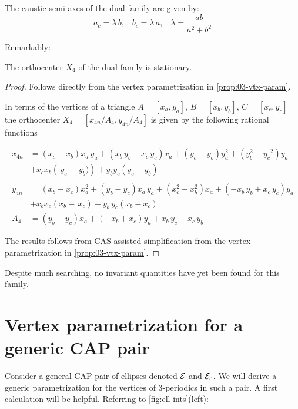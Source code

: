 \begin{proposition}
The caustic semi-axes of the dual family are given by:
\[ a_c=\lambda\,b,\;\;\;b_c=\lambda\,a,\;\;\;\lambda=\frac{a b}{a^2+b^2} \]
\label{prop:03-dual-cayley}
\end{proposition}

Remarkably:

\begin{proposition}
The orthocenter $X_4$ of the dual family is stationary.
\end{proposition}

\begin{proof}
Follows directly from the vertex parametrization in \cref{prop:03-vtx-param}.

In terms of the vertices of a triangle $A=[x_a,y_a]$, $B=[x_b,y_b]$, $C=[x_c,y_c]$ the orthocenter $X_4=[x_{4n}/A_4,y_{4n}/A_4]$ is given by the following rational functions 

\begin{align*}
    x_{4n}&=   \left(x_c-x_b\right) x_a\,y_a+ \left( 
 x_b\,y_b-x_c\,y_c \right) x_a+ \left( y_c-y_b \right) y_a^2+ \left( y_b^2-{y_c}^{2} \right) y_a\\
&+  x_cx_b\left( \,y_c- \,y_b)
 \right) +y_by_c( y_c-y_b) \\
 \\
 y_{4n}&=  \left(x_b-x_c\right) x_a^2+ \left( y_b-y_c \right) x_a\,y_a+ \left( x_c^2-x_b^2\right) x_a+ \left( -x_b\,y_b+x_c\,y_c \right) y_a\\
 &+x_b  x_c(x_b- \,x_c)+ y_b\,y_c(x_b-x_c) \\
A_4&= \left(y_b-y_c \right) x_a+ \left( -x_b+x_c\right) y_a+x_b\,y_c-x_c\,y_b
\end{align*}

The results follows from CAS-assisted simplification from the vertex parametrization in \cref{prop:03-vtx-param}.
\end{proof}

Despite much searching, no invariant quantities have yet been found for this family.

\section{Vertex parametrization for a generic CAP pair}
\label{sec:03-cap-vtx-param}

Consider a general CAP pair of ellipses denoted $\mathcal{E}$ and $\mathcal{E}_c$. We will derive a generic parametrization for the vertices of 3-periodics in such a pair. A first calculation will be helpful. Referring to \cref{fig:ell-ints}(left):

